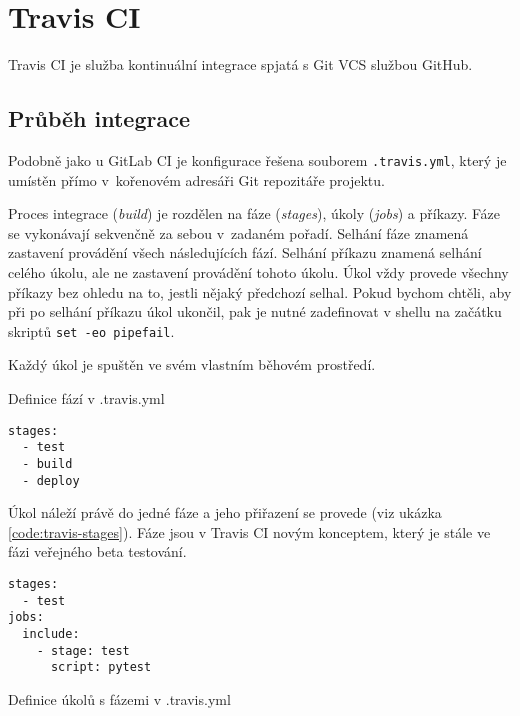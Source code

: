 \section{Travis CI}

Travis CI je služba kontinuální integrace spjatá s Git VCS službou GitHub.

\subsection{Průběh integrace}

Podobně jako u GitLab CI je konfigurace řešena souborem \verb|.travis.yml|, který je umístěn přímo v~kořenovém adresáři Git repozitáře projektu.

Proces integrace (\textit{build}) je rozdělen na fáze (\textit{stages}), úkoly (\textit{jobs}) a příkazy.
Fáze se vykonávají sekvenčně za sebou v~zadaném pořadí.
Selhání fáze znamená zastavení provádění všech následujících fází.
Selhání příkazu znamená selhání celého úkolu, ale ne zastavení provádění tohoto úkolu.
Úkol vždy provede všechny příkazy bez ohledu na to, jestli nějaký předchozí selhal. 
Pokud bychom chtěli, aby při po selhání příkazu úkol ukončil, pak je nutné zadefinovat v shellu na začátku skriptů \verb|set -eo pipefail|.

Každý úkol je spuštěn ve svém vlastním běhovém prostředí.

\begin{listing}[ht]
\caption{\label{code:travis-stages}Definice fází v .travis.yml}
\begin{verbatim}
stages:
  - test
  - build
  - deploy
\end{verbatim}
\end{listing}

Úkol náleží právě do jedné fáze a jeho přiřazení se provede (viz ukázka \ref{code:travis-stages}).
Fáze jsou v Travis CI novým konceptem, který je stále ve fázi veřejného beta testování.

\begin{listing}[ht]
\begin{verbatim}
stages:
  - test
jobs:
  include:
    - stage: test
      script: pytest

\end{verbatim}
\label{code:travis-stages}
\caption{Definice úkolů s fázemi v .travis.yml}
\end{listing}

